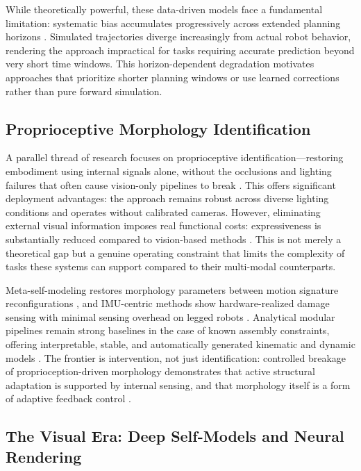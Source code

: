 \documentclass[12pt,a4paper,oneside]{report}
\begin{document}
While theoretically powerful, these data-driven models face a fundamental limitation: systematic bias accumulates progressively across extended planning horizons \cite{kwiatkowski2019task}. Simulated trajectories diverge increasingly from actual robot behavior, rendering the approach impractical for tasks requiring accurate prediction beyond very short time windows. This horizon-dependent degradation motivates approaches that prioritize shorter planning windows or use learned corrections rather than pure forward simulation.

\subsection{Proprioceptive Morphology Identification}

A parallel thread of research focuses on proprioceptive identification—restoring embodiment using internal signals alone, without the occlusions and lighting failures that often cause vision-only pipelines to break \cite{hu2024reconfigurable}. This offers significant deployment advantages: the approach remains robust across diverse lighting conditions and operates without calibrated cameras. However, eliminating external visual information imposes real functional costs: expressiveness is substantially reduced compared to vision-based methods \cite{farghdani2025robust}. This is not merely a theoretical gap but a genuine operating constraint that limits the complexity of tasks these systems can support compared to their multi-modal counterparts.

Meta-self-modeling restores morphology parameters between motion signature reconfigurations \cite{hu2024reconfigurable}, and IMU-centric methods show hardware-realized damage sensing with minimal sensing overhead on legged robots \cite{farghdani2025robust}. Analytical modular pipelines remain strong baselines in the case of known assembly constraints, offering interpretable, stable, and automatically generated kinematic and dynamic models \cite{dogra2022unified}. The frontier is intervention, not just identification: controlled breakage of proprioception-driven morphology demonstrates that active structural adaptation is supported by internal sensing, and that morphology itself is a form of adaptive feedback control \cite{xu2026antenna, yu2026kinematicself}.

\subsection{The Visual Era: Deep Self-Models and Neural Rendering}
\end{document}
